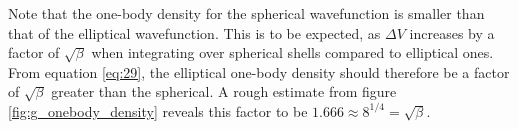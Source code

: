 \documentclass[
    a4paper, aps, twocolumn, floatfix, superscriptaddress,
    nofootinbib]{revtex4-1}
\begin{document}
Note that the one-body density for the spherical wavefunction is smaller than that of the elliptical wavefunction. This is to be expected, as $\Delta V$ increases by a factor of $\sqrt{\beta}$ when integrating over spherical shells compared to elliptical ones. From equation \eqref{eq:29}, the elliptical one-body density should therefore be a factor of $\sqrt{\beta}$ greater than the spherical. A rough estimate from figure \ref{fig:g_onebody_density} reveals this factor to be $1.666 \approx 8^{1/4} = \sqrt{\beta}$.

\begin{table}[H]

\caption{Local energy as a function of $\alpha$ when running the brute force algorithm for $N = 10$, 50 and 100 particles in 3 dimensions. This is done with $2^{17}$ steps for $N=10, 50$, whereas the computation for $N=100$ is done with $2^{16}$ steps. All is run with a step length 1.0.}
\label{tab:e_brute_force_localE_stepLength_1.0}
\centering
{}
\end{table}
\end{document}
